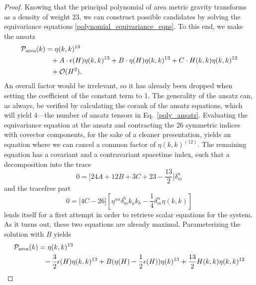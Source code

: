 \begin{proof}
  Knowing that the principal polynomial of area metric gravity transforms as a density of weight 23, we can construct possible candidates by solving the equivariance equations \eqref{polynomial_equivariance_eqns}. To this end, we make the ansatz
  \begin{equation}\label{poly_ansatz}
    \begin{aligned}
      \mathcal P_\text{area}(k) &{} = \eta(k,k)^{13} \\
                                &{} \hphantom{=} + A\cdot \epsilon(H) \eta(k,k)^{13} + B\cdot \eta(H) \eta(k,k)^{13} + C\cdot H(k,k)\eta(k,k)^{12} \\
                                &{} \hphantom{=} + \mathcal O(H^2).
    \end{aligned}
  \end{equation}
An overall factor would be irrelevant, so it has already been dropped when setting the coefficient of the constant term to 1. The generality of the ansatz can, as always, be verified by calculating the corank of the ansatz equations, which will yield 4---the number of ansatz tensors in Eq.~\eqref{poly_ansatz}. Evaluating the equivariance equation at the ansatz and contracting the 26 symmetric indices with covector components, for the sake of a cleaner presentation, yields an equation where we can cancel a common factor of $\eta(k,k)^{(12)}$. The remaining equation has a covariant and a contravariant spacetime index, such that a decomposition into the trace
\begin{equation}
  0 = \lbrack 24 A + 12 B + 3 C + 23 - \frac{13}{2}\rbrack \delta^n_m
\end{equation}
and the tracefree part
\begin{equation}
  0 = \lbrack 4 C - 26\rbrack [\eta^{na}\delta^b_m k_a k_b - \frac{1}{4} \delta^n_m\eta(k,k)]
\end{equation}
lends itself for a first attempt in order to retrieve scalar equations for the system. As it turns out, these two equations are already maximal. Parameterizing the solution with $B$ yields
\begin{equation}\label{general_area_metric_gravity_poly}
  \begin{aligned}
    \mathcal P_\text{area}(k) &{} = \eta(k,k)^{13} \\
                              &{} \hphantom{=} - \frac{3}{2} \epsilon(H)\eta(k,k)^{13} + B(\eta(H)-\frac{1}{2}\epsilon(H))\eta(k)^{13} + \frac{13}{2} H(k,k)\eta(k,k)^{12} \\ 

\end{aligned}
\end{equation}
\end{proof}
